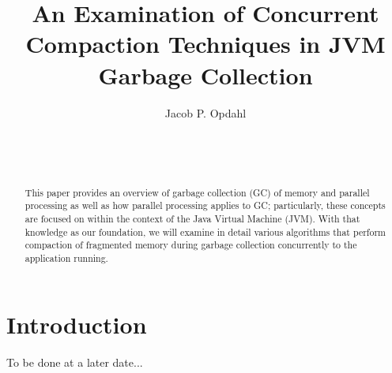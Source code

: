 \documentclass{sig-alternate}
\begin{document}

\title{An Examination of Concurrent Compaction Techniques in JVM Garbage Collection}


\author{
\alignauthor
Jacob P. Opdahl\\
	\\
	\\
	\\
}

\maketitle
\begin{abstract}
This paper provides an overview of garbage collection (GC) of memory and parallel
processing as well as how parallel processing applies to GC; particularly, these
concepts are focused on within the context of the Java Virtual Machine (JVM).
With that knowledge as our foundation, we will examine in detail various
algorithms that perform compaction of fragmented memory during garbage 
collection concurrently to the application running.
\end{abstract}


\section{Introduction}
\label{sec:introduction}

To be done at a later date...
\end{document}
